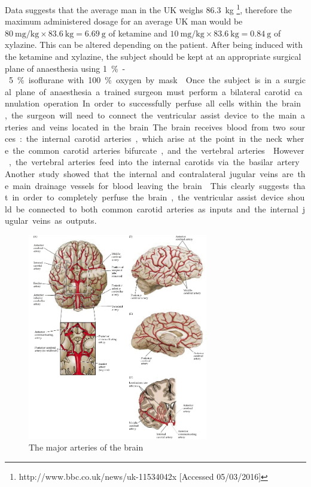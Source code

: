 \documentclass[a4paper, 11pt]{article}
\numberwithin{equation}{section}
\begin{document}
Data suggests that the average man in the UK weighs \SI{86.3}{\kilo\gram} \footnote{http://www.bbc.co.uk/news/uk-11534042x [Accessed 05/03/2016]}, therefore the maximum administered dosage for an average UK man would be $\SI{80}{\milli\gram\per\kilo\gram}\times\SI{83.6}{\kilo\gram}=\SI{6.69}{\gram}$ of ketamine and $\SI{10}{\milli\gram\per\kilo\gram}\times\SI{83.6}{\kilo\gram}=\SI{0.84}{\gram} $ of xylazine. This can be altered depending on the patient. After being induced with the ketamine and xylazine, the subject should be kept at an appropriate surgical plane of anaesthesia using \SI{1}\% - \SI{5}\% isoflurane with \SI{100}\% oxygen by mask \cite{Aldehyde_stabilized_cryopreservation}.

Once the subject is in a surgical plane of anaesthesia a trained surgeon must perform a bilateral carotid cannulation operation. In order to successfully perfuse all cells within the brain, the surgeon will need to connect the ventricular assist device to the main arteries and veins located in the brain. The brain receives blood from two sources: the internal carotid arteries, which arise at the point in the neck where the common carotid arteries bifurcate, and the vertebral arteries \cite{BloodSupplyotheBrain}. However, the vertebral arteries feed into the internal carotids via the basilar artery. Another study showed that the internal and contralateral jugular veins are the main drainage vessels for blood leaving the brain \cite{Doepp2004}. This clearly suggests that in order to completely perfuse the brain, the ventricular assist device should be connected to both common carotid arteries as inputs and the internal jugular veins as outputs. 

\begin{figure}[h]
\centering
\includegraphics[width=0.70\textwidth]{Brain_blood_flow.jpg}
\caption{\label{fig:Brain_Flow}The major arteries of the brain \cite{BloodSupplyotheBrain}}
\end{figure}
\end{document}
